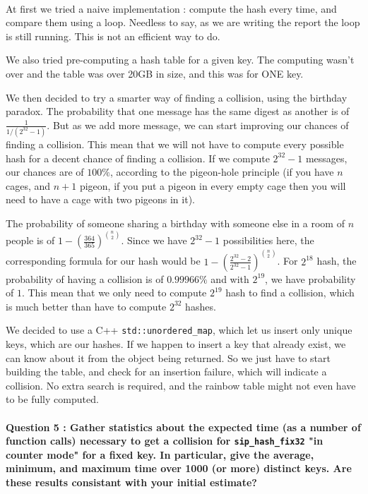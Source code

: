 \documentclass[4apaper]{report}
\begin{document}
\paragraph{} At first we tried a naive implementation : compute the hash every time, and compare them using a loop. Needless to say, as we are writing the report the loop is still running. This is not an efficient way to do.

We also tried pre-computing a hash table for a given key. The computing wasn't over and the table was over 20GB in size, and this was for ONE key.

We then decided to try a smarter way of finding a collision, using the birthday paradox. The probability that one message has the same digest as another is of $\frac{1}{1/(2^{32} - 1)}$. But as we add more message, we can start improving our chances of finding a collision. This mean that we will not have to compute every possible hash for a decent chance of finding a collision. If we compute $2^{32}-1$ messages, our chances are of $100\%$, according to the pigeon-hole principle (if you have $n$ cages, and $n+1$ pigeon, if you put a pigeon in every empty cage then you will need to have a cage with two pigeons in it).

The probability of someone sharing a birthday with someone else in a room of $n$ people is of $1 - (\frac {364}{365})^{\binom {n}{2}}$. Since we have $2^{32}-1$ possibilities here, the corresponding formula for our hash would be  $1 - (\frac {2^{32}-2}{2^{32}-1})^{\binom {n}{2}}$. For $2^{18}$ hash, the probability of having a collision is of $0.99966\%$ and with $2^{19}$, we have probability of $1$. This mean that we only need to compute $2^{19}$ hash to find a collision, which is much better than have to compute $2^{32}$ hashes.

We decided to use a C++ \texttt{std::unordered\_map}, which let us insert only unique keys, which are our hashes. If we happen to insert a key that already exist, we can know about it from the object being returned. So we just have to start building the table, and check for an insertion failure, which will indicate a collision. No extra search is required, and the rainbow table might not even have to be fully computed.

\paragraph{Question 5 : Gather statistics about the expected time (as a number of function calls) necessary to get a
collision for \texttt{sip\_hash\_fix32} "in counter mode" for a fixed key. In particular, give the average, minimum, and maximum time over 1000 (or more) distinct keys. Are these results consistant
with your initial estimate?}
\end{document}
